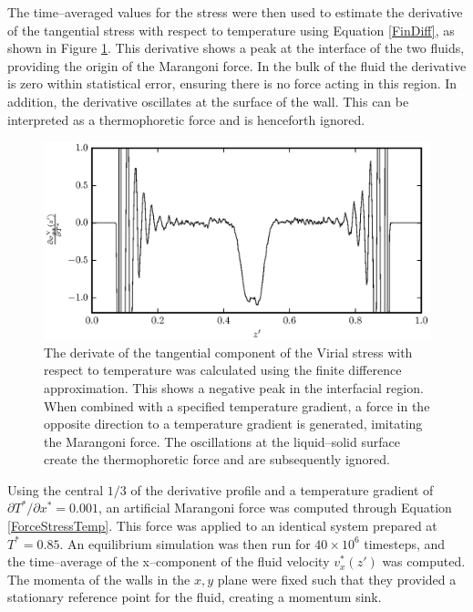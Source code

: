 The time--averaged values for the stress were then used to estimate the derivative of the tangential stress with respect to temperature using Equation \ref{FinDiff}, as shown in Figure \ref{PisVirForce}.
This derivative shows a peak at the interface of the two fluids, providing the origin of the Marangoni force.
In the bulk of the fluid the derivative is zero within statistical error, ensuring there is no force acting in this region.
In addition, the derivative oscillates at the surface of the wall.
This can be interpreted as a thermophoretic force and is henceforth ignored.

\begin{figure}[h!]
\centering
\includegraphics[scale=1.0]{PisVirForce}
\caption{The derivate of the tangential component of the Virial stress with respect to temperature was calculated using the finite difference approximation.
This shows a negative peak in the interfacial region.
When combined with a specified temperature gradient, a force in the opposite direction to a temperature gradient is generated, imitating the Marangoni force.
The oscillations at the liquid--solid surface create the thermophoretic force and are subsequently ignored.}
\label{PisVirForce}
\end{figure}
\FloatBarrier

Using the central $1/3$ of the derivative profile and a temperature gradient of $\partial T^{*} / \partial x^{*} = 0.001$, an artificial Marangoni force was computed through Equation \ref{ForceStressTemp}.
This force was applied to an identical system prepared at $T^{*} = 0.85$.
An equilibrium simulation was then run for $40 \times 10^{6}$ timesteps, and the time--average of the x--component of the fluid velocity $v^{*}_{x}(z')$ was computed.
The momenta of the walls in the $x,y$ plane were fixed such that they provided a stationary reference point for the fluid, creating a momentum sink.

